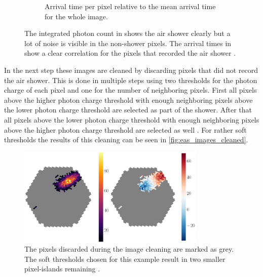 \begin{figure}
\begin{subfigure}{0.49\textwidth}
        \caption{Arrival time per pixel relative to the mean arrival time for the whole image.}
        \label{fig:eas_image2}
    \end{subfigure}
    \caption{The integrated photon count in  shows the air shower clearly but a lot of noise is visible in the non-shower pixels.
        The arrival times in  show a clear correlation for the pixels that recorded the air shower \cite{lukas}.
    }
    \label{fig:eas_images}
\end{figure}

In the next step these images are cleaned by discarding pixels that did not record the air shower. 
This is done in multiple steps using two thresholds for the photon charge of each pixel and one for the number of neighboring pixels.
First all pixels above the higher photon charge threshold with enough neighboring pixels above the lower photon charge threshold are selected as part of the shower.
After that all pixels above the lower photon charge threshold with enough neighboring pixels above the higher photon charge threshold are selected as well \cite{lukas}.
For rather soft thresholds the results of this cleaning can be seen in \autoref{fig:eas_images_cleaned}.
\begin{figure}
    \centering
    \includegraphics[width=0.8\textwidth]{images/eas_images_cleaned.png}
    \caption{The pixels discarded during the image cleaning are marked as grey. The soft thresholds chosen for this example result in two smaller pixel-islands remaining \cite{lukas}.}
    \label{fig:eas_images_cleaned}
\end{figure}

